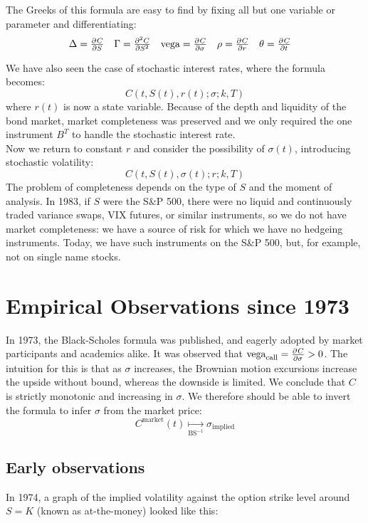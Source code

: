 \documentclass[11pt]{article}
\begin{document}
The Greeks of this formula are easy to find by fixing all but one variable or parameter and differentiating:
\begin{align*}
\Delta &= \pd{C}{S} & 
\Gamma &= \pd[2]{C}{S} &
\text{vega} &= \pd{C}{\sigma} &
\rho &= \pd{C}{r} &
\theta &= \pd{C}{t}
\end{align*}

We have also seen the case of stochastic interest rates, where the formula becomes:
$$C(t, S(t), r(t); \sigma; k, T)$$
where $r(t)$ is now a state variable. Because of the depth and liquidity of the bond market, market completeness was preserved and we only required the one instrument $B^T$ to handle the stochastic interest rate. \\

Now we return to constant $r$ and consider the possibility of $\sigma(t)$, introducing stochastic volatility:
$$C(t, S(t), \sigma(t); r; k, T)$$
The problem of completeness depends on the type of $S$ and the moment of analysis. In 1983, if $S$ were the S\&P 500, there were no liquid and continuously traded variance swaps, VIX futures, or similar instruments, so we do not have market completeness: we have a source of risk for which we have no hedgeing instruments. Today, we have such instruments on the S\&P 500, but, for example, not on single name stocks. 

\section{Empirical Observations since 1973}

In 1973, the Black-Scholes formula was published, and eagerly adopted by market participants and academics alike. It was observed that $\text{vega}_\text{call} = \pd{C}{\sigma} > 0$. The intuition for this is that as $\sigma$ increases, the Brownian motion excursions increase the upside without bound, whereas the downside is limited. We conclude that $C$ is strictly monotonic and increasing in $\sigma$. We therefore should be able to invert the formula to infer $\sigma$ from the market price:
$$C^\text{market}(t) \underset{\text{BS}^{-1}}\longmapsto \sigma_\text{implied}$$

\subsection{Early observations}
In 1974, a graph of the implied volatility against the option strike level around $S=K$ (known as at-the-money) looked like this:\\ 
\end{document}
